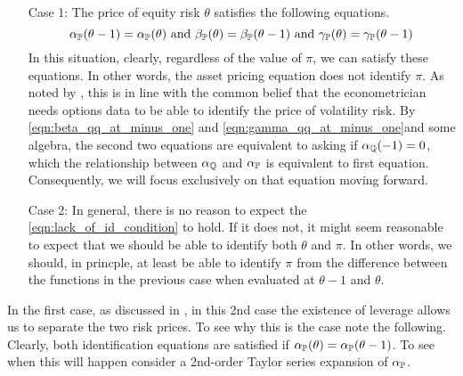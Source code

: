 \documentclass[11pt, letterpaper, twoside, final]{article}
\begin{document}
\begin{enumerate}
    \item[Case 1:] The price of equity risk $\theta$ satisfies the following equations. 
        \begin{equation}
            \alpha_{\PP}(\theta - 1) = \alpha_{\PP}(\theta)\ \text{and}\ \beta_{\PP}(\theta) = \beta_{\PP}(\theta
            -1)\ \text{and}\ \gamma_{\PP}(\theta) = \gamma_{\PP}(\theta - 1)
            \label{eqn:lack_of_id_condition}
        \end{equation}
        In this situation, clearly, regardless of the value of $\pi$, we can satisfy these equations.
        In other words, the asset pricing equation does not identify $\pi$. 
        As noted by \textcite{khrapov2016affine}, this is in line with the common belief that the econometrician
        needs options data to be able to identify the price of volatility risk. 
        By \cref{eqn:beta_qq_at_minus_one} and \cref{eqn:gamma_qq_at_minus_one}and some algebra, the second two
        equations are equivalent to asking if $\alpha_{\mathbb{Q}}(-1) = 0$, which the relationship between
        $\alpha_{\mathbb{Q}}$ and $\alpha_{\mathbb{P}}$ is equivalent to first equation.
        Consequently, we will focus exclusively on that equation moving forward.

    \item[Case 2:] 
        In general, there is no reason to expect the \cref{eqn:lack_of_id_condition} to hold.
        If it does not, it might seem reasonable to expect that we should be able to identify both $\theta$ and
        $\pi$.
        In other words, we should, in princple, at least be able to identify $\pi$ from the difference between the
        functions in the previous case when evaluated at $\theta-1$ and $\theta$.
\end{enumerate}

In the first case, as discussed in \textcite[13]{khrapov2016affine}, in this 2nd case the existence of leverage
allows us to separate the two risk prices.
To see why this is the case note the following.
Clearly, both identification equations are satisfied if $\alpha_{\mathbb{P}}(\theta) = \alpha_{\mathbb{P}}(\theta -1)$.
To see when this will happen consider a 2nd-order Taylor series expansion of $\alpha_{\mathbb{P}}$.
\end{document}
